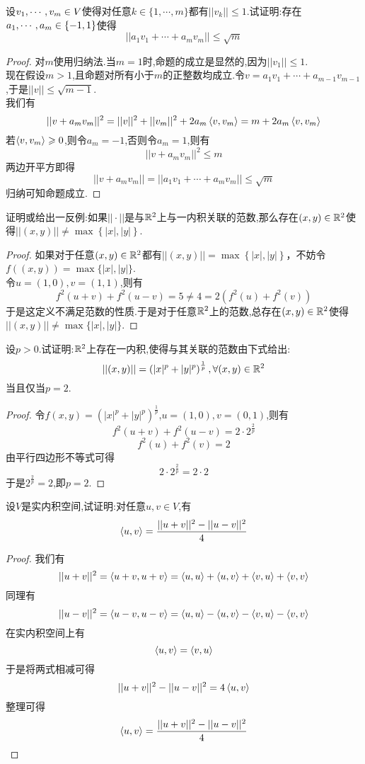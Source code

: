 \documentclass{ctexart}
\begin{document}
\begin{problem}[23.]
    设${v}_1,\cdots,{v}_{m}\in V$使得对任意$k\in\{1,\cdots,m\}$都有$||v_k||\leqslant1$.试证明:存在${a}_1,\cdots,{a}_{m}\in\{-1,1\}$使得
    \[||a_1v_1+\cdots+a_mv_m||\leqslant\sqrt m\]
\end{problem}
\begin{proof}
    对$m$使用归纳法.当$m=1$时,命题的成立是显然的,因为$||v_1||\leqslant1$.\\
    现在假设$m>1$,且命题对所有小于$m$的正整数均成立.令$v=a_1v_1+\cdots+a_{m-1}v_{m-1}$,于是$||v||\leqslant\sqrt{m-1}$.\\
    我们有
    \[||v+a_mv_m||^2=||v||^2+||v_m||^2+2a_m\left\langle{v},{v_m}\right\rangle=m+2a_m\left\langle{v},{v_m}\right\rangle\]
    若$\left\langle{v},{v_m}\right\rangle\geqslant0$,则令$a_m=-1$,否则令$a_m=1$,则有
    \[||v+a_mv_m||^2\leqslant m\]
    两边开平方即得
    \[||v+a_mv_m||=||a_1v_1+\cdots+a_mv_m||\leqslant\sqrt{m}\]
    归纳可知命题成立.
\end{proof}
\begin{problem}[24.]
    证明或给出一反例:如果$||\cdot||$是与$\mathbb{R}^2$上与一内积关联的范数,那么存在$(x,y)\in\mathbb{R}^2$使得$||(x,y)||\neq\max\left\{|x|,|y|\right\}$.
\end{problem}
\begin{proof}
    如果对于任意$(x,y)\in\mathbb{R}^2$都有$||(x,y)||=\max\left\{|x|,|y|\right\}$，不妨令$f((x,y))=\max\{|x|,|y|\}$.\\
    令$u=(1,0),v=(1,1)$,则有
    \[f^2(u+v)+f^2(u-v)=5\neq4=2\left(f^2(u)+f^2(v)\right)\]
    于是这定义不满足范数的性质.于是对于任意$\mathbb{R}^2$上的范数,总存在$(x,y)\in\mathbb{R}^2$使得$||(x,y)||\neq\max\{|x|,|y|\}$.
\end{proof}
\begin{problem}[25.]
    设$p>0$.试证明:$\mathbb{R}^2$上存在一内积,使得与其关联的范数由下式给出:
    \[||(x,y)||=\left(|x|^p+|y|^p\right)^{\frac 1p},\forall(x,y)\in\mathbb{R}^2\]
    当且仅当$p=2$.
\end{problem}
\begin{proof}
    令$f(x,y)=\left(|x|^p+|y|^p\right)^{\frac 1p}$,$u=(1,0),v=(0,1)$,则有
    \[f^2(u+v)+f^2(u-v)=2\cdot2^{\frac 2p}\]
    \[f^2(u)+f^2(v)=2\]
    由平行四边形不等式可得
    \[2\cdot2^{\frac{2}{p}}=2\cdot 2\]
    于是$2^{\frac 2p}=2$,即$p=2$.
\end{proof}
\begin{problem}[26.]
    设$V$是实内积空间,试证明:对任意$u,v\in V$,有
    \[\left\langle{u},{v}\right\rangle=\dfrac{||u+v||^2-||u-v||^2}{4}\]
\end{problem}
\begin{proof}
    我们有
    \[||u+v||^2=\left\langle{u+v},{u+v}\right\rangle=\left\langle{u},{u}\right\rangle+\left\langle{u},{v}\right\rangle+\left\langle{v},{u}\right\rangle+\left\langle{v},{v}\right\rangle\]
    同理有
    \[||u-v||^2=\left\langle{u-v},{u-v}\right\rangle=\left\langle{u},{u}\right\rangle-\left\langle{u},{v}\right\rangle-\left\langle{v},{u}\right\rangle-\left\langle{v},{v}\right\rangle\]
    在实内积空间上有
    \[\left\langle{u},{v}\right\rangle=\left\langle{v},{u}\right\rangle\]
    于是将两式相减可得
    \[||u+v||^2-||u-v||^2=4\left\langle{u},{v}\right\rangle\]
    整理可得
    \[\left\langle{u},{v}\right\rangle=\dfrac{||u+v||^2-||u-v||^2}{4}\]
\end{proof}
\end{document}
